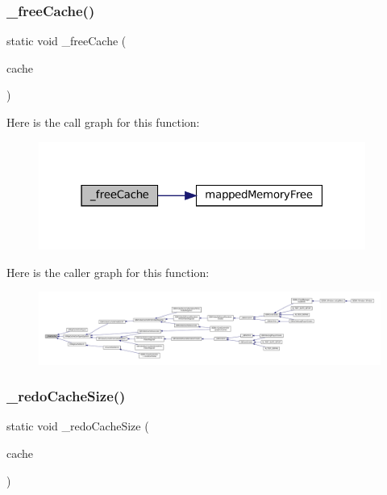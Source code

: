 \subsubsection{\texorpdfstring{\+\_\+free\+Cache()}{\_freeCache()}}
{\footnotesize\ttfamily static void \+\_\+free\+Cache (\begin{DoxyParamCaption}\item[{struct m\+Map\+Cache $\ast$}]{cache }\end{DoxyParamCaption})\hspace{0.3cm}{\ttfamily [static]}}

Here is the call graph for this function\+:
\nopagebreak
\begin{figure}[H]
\begin{center}
\leavevmode
\includegraphics[width=304pt]{map-cache_8c_a5409e1d298b34a1384ad3b76fab685c5_cgraph}
\end{center}
\end{figure}
Here is the caller graph for this function\+:
\nopagebreak
\begin{figure}[H]
\begin{center}
\leavevmode
\includegraphics[width=350pt]{map-cache_8c_a5409e1d298b34a1384ad3b76fab685c5_icgraph}
\end{center}
\end{figure}
\mbox{\label{map-cache_8c_ab08e2be4f74e6da3a5ec9ef9e0c5a040}} 
\subsubsection{\texorpdfstring{\+\_\+redo\+Cache\+Size()}{\_redoCacheSize()}}
{\footnotesize\ttfamily static void \+\_\+redo\+Cache\+Size (\begin{DoxyParamCaption}\item[{struct m\+Map\+Cache $\ast$}]{cache }\end{DoxyParamCaption})\hspace{0.3cm}{\ttfamily [static]}}

